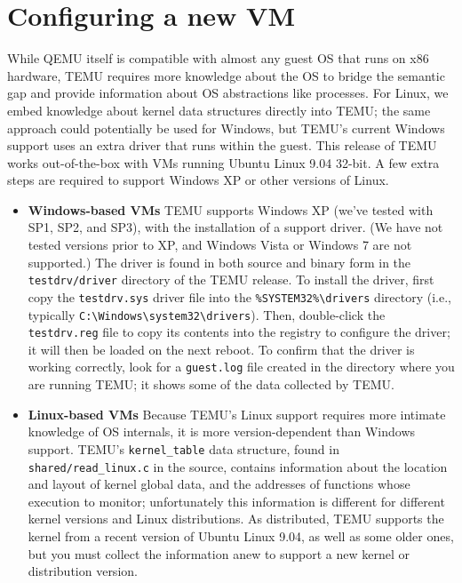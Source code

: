 \section {\label{sec:vmconfig}Configuring a new VM}
While QEMU itself is compatible with almost any guest OS that runs on
x86 hardware, TEMU requires more knowledge about the OS to bridge the
semantic gap and provide information about OS abstractions like
processes.
For Linux, we embed knowledge about kernel data structures directly
into TEMU; the same approach could potentially be used for Windows,
but TEMU's current Windows support uses an extra driver that runs
within the guest.
This release of TEMU works out-of-the-box with VMs running Ubuntu
Linux 9.04 32-bit.
A few extra steps are required to support Windows XP or other versions
of Linux.

\begin{itemize}
\item \textbf{Windows-based VMs}
TEMU supports Windows XP (we've tested with SP1, SP2, and SP3), with
the installation of a support driver.
(We have not tested versions prior to XP, and Windows Vista or Windows
7 are not supported.)
The driver is found in both source and binary form in the
\texttt{testdrv/driver} directory of the TEMU release.
To install the driver, first copy the \texttt{testdrv.sys} driver file
into the \verb'%SYSTEM32%\drivers' directory (i.e., typically 
\verb'C:\Windows\system32\drivers').
Then, double-click the \texttt{testdrv.reg} file to copy its contents
into the registry to configure the driver; it will then be loaded on
the next reboot.
To confirm that the driver is working correctly, look for a
\texttt{guest.log} file created in the directory where you are running
TEMU; it shows some of the data collected by TEMU.

\item \textbf{Linux-based VMs}
Because TEMU's Linux support requires more intimate knowledge of OS
internals, it is more version-dependent than Windows support.
TEMU's \texttt{kernel\_table} data structure, found in
\texttt{shared/read\_linux.c} in the source, contains information
about the location and layout of kernel global data, and the addresses
of functions whose execution to monitor; unfortunately this
information is different for different kernel versions and Linux
distributions.
As distributed, TEMU supports the kernel from a recent version of
Ubuntu Linux 9.04, as well as some older ones, but you must collect
the information anew to support a new kernel or distribution version.


\end{itemize}
